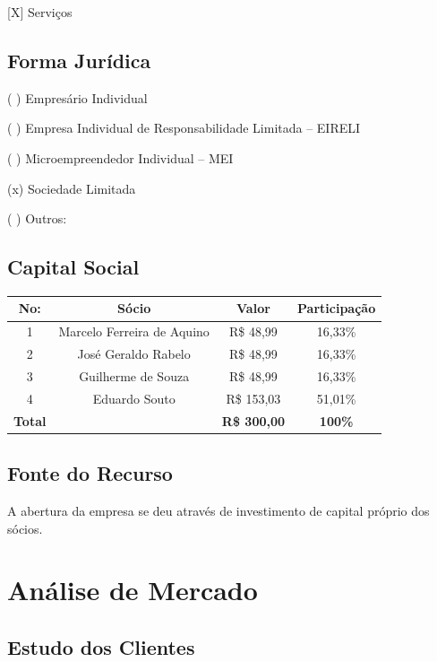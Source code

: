 \documentclass[
	12pt,				%
	openright,			%
	twoside,			%
	a4paper,			%
	english,			%
	french,				%
	spanish,			%
	brazil,				%
	]{abntex2}
\begin{document}
[X] Serviços

\section{Forma Jurídica}

( ) Empresário Individual

( ) Empresa Individual de Responsabilidade Limitada – EIRELI

( ) Microempreendedor Individual – MEI

(x) Sociedade Limitada

( ) Outros:

\section{Capital Social}

\begin{center}
	\begin{tabular}{|c|c|c|c|}
		\hline
		\textbf{No:}	& \textbf{Sócio}				& \textbf{Valor} & \textbf{Participação} \\ \hline
		1				& Marcelo Ferreira de Aquino 	& R\$ 48,99 & 16,33\% \\ \hline
		2				& José Geraldo Rabelo 			& R\$ 48,99 & 16,33\% \\ \hline
		3				& Guilherme de Souza 			& R\$ 48,99 & 16,33\% \\ \hline
		4				& Eduardo Souto 				& R\$ 153,03 & 51,01\% \\ \hline
		\textbf{Total}	& 	 							& \textbf{R\$ 300,00} & \textbf{100\% }\\ \hline
	\end{tabular}
\end{center}

\section{Fonte do Recurso}

A abertura da empresa se deu através de investimento de capital próprio dos sócios.



\chapter{Análise de Mercado}

\section{Estudo dos Clientes}
\end{document}
